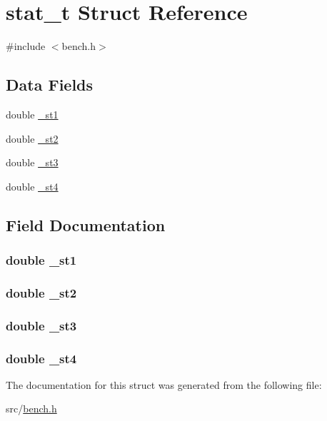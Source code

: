 \hypertarget{structstat__t}{\section{stat\-\_\-t Struct Reference}
\label{structstat__t}
}


{\ttfamily \#include $<$bench.\-h$>$}

\subsection*{Data Fields}
\begin{DoxyCompactItemize}
\item 
double \hyperlink{structstat__t_a05d0dc2aab49b1223f9ddef0829c6e3f}{\-\_\-st1}
\item 
double \hyperlink{structstat__t_a0f0426e895729fc01d907a8d1420000c}{\-\_\-st2}
\item 
double \hyperlink{structstat__t_a29607d8ebd6e6c64afd2923bf61317a1}{\-\_\-st3}
\item 
double \hyperlink{structstat__t_af1bc36c6aa3cbde6346778ec5e9ea24f}{\-\_\-st4}
\end{DoxyCompactItemize}


\subsection{Field Documentation}
\hypertarget{structstat__t_a05d0dc2aab49b1223f9ddef0829c6e3f}{
\subsubsection[{\-\_\-st1}]{\setlength{\rightskip}{0pt plus 5cm}double {\bf \-\_\-st1}}}\label{structstat__t_a05d0dc2aab49b1223f9ddef0829c6e3f}
\hypertarget{structstat__t_a0f0426e895729fc01d907a8d1420000c}{
\subsubsection[{\-\_\-st2}]{\setlength{\rightskip}{0pt plus 5cm}double {\bf \-\_\-st2}}}\label{structstat__t_a0f0426e895729fc01d907a8d1420000c}
\hypertarget{structstat__t_a29607d8ebd6e6c64afd2923bf61317a1}{
\subsubsection[{\-\_\-st3}]{\setlength{\rightskip}{0pt plus 5cm}double {\bf \-\_\-st3}}}\label{structstat__t_a29607d8ebd6e6c64afd2923bf61317a1}
\hypertarget{structstat__t_af1bc36c6aa3cbde6346778ec5e9ea24f}{
\subsubsection[{\-\_\-st4}]{\setlength{\rightskip}{0pt plus 5cm}double {\bf \-\_\-st4}}}\label{structstat__t_af1bc36c6aa3cbde6346778ec5e9ea24f}


The documentation for this struct was generated from the following file\-:\begin{DoxyCompactItemize}
\item 
src/\hyperlink{bench_8h}{bench.\-h}\end{DoxyCompactItemize}
